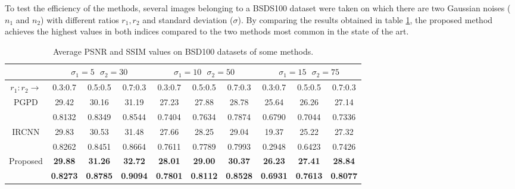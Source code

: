 To test the efficiency of the methods, several images belonging to a 
BSDS100 dataset \cite{0884882842} were taken on which there are two Gaussian noises ($n_1$ 
and $n_2$) with different ratios $r_1, r_2$ and standard deviation ($\sigma$). By comparing the 
results obtained in table \ref{indexCompare}, the proposed method achieves the highest values 
in both indices compared to the two methods \cite{0884882815} \cite{0884882819} most common in the 
state of the art.
\begin{table}[h!]
    \centering
    \begin{adjustbox}{max width=\textwidth}
    \begin{tabular}{|c||ccc|ccc|ccc|}
        \hline
            & \multicolumn{3}{c||}{$\sigma_1=5 ~~~\sigma_2=30 $} & \multicolumn{3}{c||}{$\sigma_1=10 ~~~\sigma_2=50 $} & \multicolumn{3}{c||}{$\sigma_1=15 ~~~\sigma_2=75 $}\\
        \hline        
        $r_1:r_2\rightarrow$ & 0.3:0.7 & 0.5:0.5 & 0.7:0.3 & 0.3:0.7 & 0.5:0.5 & 0.7:0.3 & 0.3:0.7 & 0.5:0.5 & 0.7:0.3\\
        \hline 
        \hline
        \multirow{2}{*}{PGPD\cite{0884882815}} & 29.42 & 30.16 & 31.19 & 27.23 & 27.88 & 28.78 &25.64 & 26.26 & 27.14\\
        & 0.8132 & 0.8349 & 0.8544 & 0.7404 & 0.7634 & 0.7874 & 0.6790 & 0.7044 & 0.7336\\
        \hline
        \multirow{2}{*}{IRCNN\cite{0884882819}} & 29.83 & 30.53 & 31.48 & 27.66 & 28.25 & 29.04 & 19.37 & 25.22 & 27.32\\
        & 0.8262 & 0.8451 & 0.8664 & 0.7611 & 0.7789 & 0.7993 & 0.2948 & 0.6423 & 0.7426\\
        \hline
        \multirow{2}{*}{Proposed} & \bfseries{29.88} & \bfseries{31.26} & \bfseries{32.72} & \bfseries{28.01} & \bfseries{29.00} & \bfseries{30.37} & \bfseries{26.23} & \bfseries{27.41} & \bfseries{28.84}\\
        & \bfseries{0.8273} & \bfseries{0.8785} & \bfseries{0.9094} & \bfseries{0.7801} & \bfseries{0.8112} & \bfseries{0.8528} & \bfseries{0.6931} & \bfseries{0.7613} & \bfseries{0.8077}\\
        \hline
    \end{tabular}
    \end{adjustbox}
    \caption{Average PSNR and SSIM values on BSD100 datasets of some methods.}
    \label{indexCompare}
\end{table}

